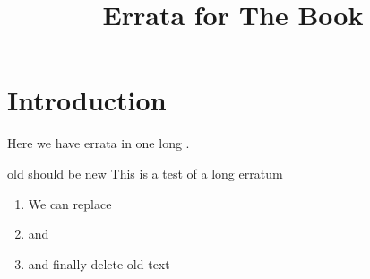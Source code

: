 \documentclass{article}
\title{Errata for The Book}
\begin{document}
\maketitle
\section{Introduction}
Here we have  errata in one  long .

\noindent
\begin{erratum}[date=2006-07-19,reported-by=Michael Kohlhase]{old should be new}
This is a test of a long erratum 
\begin{enumerate}
  \item We can replace  
  \item and 
  \item and finally delete old text
  \end{enumerate}
\end{erratum}
\end{document}
